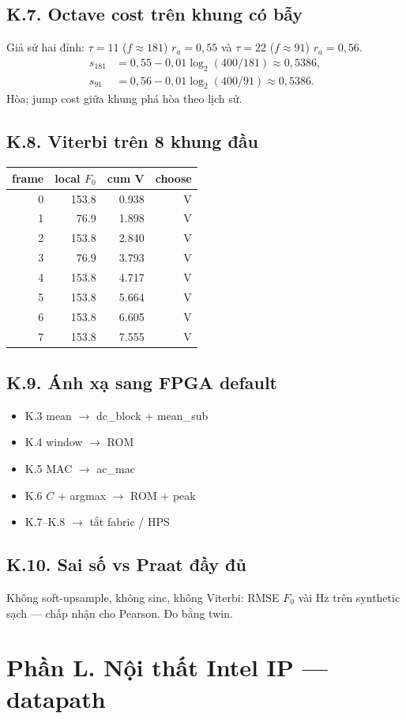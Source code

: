 \subsection*{K.7. Octave cost trên khung có bẫy}
Giả sử hai đỉnh: $\tau=11$ ($f\approx181$) $r_a=0{,}55$ và $\tau=22$ ($f\approx91$) $r_a=0{,}56$.
\begin{align*}
s_{181}&=0{,}55-0{,}01\log_2(400/181)\approx0{,}5386,\\
s_{91}&=0{,}56-0{,}01\log_2(400/91)\approx0{,}5386.
\end{align*}
Hòa; jump cost giữa khung phá hòa theo lịch sử.
\subsection*{K.8. Viterbi trên 8 khung đầu}
\begin{center}\scriptsize\begin{tabular}{@{}rrrr@{}}
\toprule frame & local $F_0$ & cum V & choose \\ \midrule
0 & 153.8 & 0.938 & V \\
1 & 76.9 & 1.898 & V \\
2 & 153.8 & 2.840 & V \\
3 & 76.9 & 3.793 & V \\
4 & 153.8 & 4.717 & V \\
5 & 153.8 & 5.664 & V \\
6 & 153.8 & 6.605 & V \\
7 & 153.8 & 7.555 & V \\
\bottomrule\end{tabular}\end{center}
\subsection*{K.9. Ánh xạ sang FPGA default}
\begin{itemize}\setlength{\itemsep}{2pt}
\item K.3 mean $\to$ dc\_block + mean\_sub
\item K.4 window $\to$ ROM
\item K.5 MAC $\to$ ac\_mac
\item K.6 $C$ + argmax $\to$ ROM + peak
\item K.7--K.8 $\to$ tắt fabric / HPS
\end{itemize}
\subsection*{K.10. Sai số vs Praat đầy đủ}
Không soft-upsample, không sinc, không Viterbi: RMSE $F_0$ vài Hz trên synthetic sạch --- chấp nhận cho Pearson. Đo bằng twin.
\newpage\section*{Phần L. Nội thất Intel IP --- datapath}

